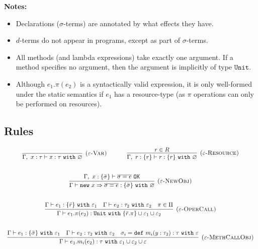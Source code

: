 \documentclass{llncs}
\newcommand{\keywadj}[1]{\mathtt{#1}}
\newcommand{\keyw}[1]{\keywadj{#1}~}
\begin{document}
\noindent \textbf{Notes:}

\begin{itemize}
	\item Declarations ($\sigma$-terms) are annotated by what effects they have.
	\item $d$-terms do not appear in programs, except as part of $\sigma$-terms.
	\item All methods (and lambda expressions) take exactly one argument. If a method specifies no argument, then the argument is implicitly of type $\keywadj{Unit}$.
	\item Although $e_1.\pi(e_2)$ is a syntactically valid expression, it is only well-formed under the static semantics if $e_1$ has a resource-type (as $\pi$ operations can only be performed on resources). 
\end{itemize}

\subsection{Rules}

\fbox{$\Gamma \vdash e : \tau~\keyw{with} \varepsilon$}

\[
\begin{array}{c}
\infer[\textsc{($\varepsilon$-Var)}]
  {\Gamma,~x:\tau \vdash x:\tau~ \keyw{with} \varnothing}
  {} 
~~~~~~~~~~
\infer[\textsc{($\varepsilon$-Resource)}]
  {\Gamma,~r :\{r\} \vdash r:\{ r \} ~ \keyw{with} \varnothing}
  {r \in R} \\[5ex]

\infer[\textsc{($\varepsilon$-NewObj)}]
	{\Gamma \vdash \keywadj{new}~x \Rightarrow \overline{\sigma = e} : \{ \bar \sigma \}~\keyw{with} \varnothing}
	{\Gamma,~x : \{ \bar \sigma \} \vdash \overline{\sigma = e}~\keywadj{OK}} \\[5ex]

\infer[\textsc{($\varepsilon$-OperCall)}]
	{\Gamma \vdash e_1.\pi(e_2) : \keyw{Unit} \keyw{with} \{ \bar r.\pi \} \cup \varepsilon_1 \cup \varepsilon_2}
	{\Gamma \vdash e_1 : \{ \bar r \}~ \keyw{with} \varepsilon_1 & \Gamma \vdash e_2:\tau_2~\keyw{with} \varepsilon_2 & \pi \in \Pi} \\[5ex]
	
\infer[\textsc{($\varepsilon$-MethCallObj)}]
	{\Gamma \vdash e_1.m_i(e_2):\tau~\keyw{with} \varepsilon_1 \cup \varepsilon_2 \cup \varepsilon}
	{\Gamma \vdash e_1 : \{ \bar \sigma \}~\keyw{with} \varepsilon_1 & \Gamma \vdash e_2 : \tau_2~\keyw{with} \varepsilon_2 & \sigma_i = \keyw{def} m_i(y:\tau_2):\tau~\keyw{with} \varepsilon}

\end{array}
\]
\end{document}
